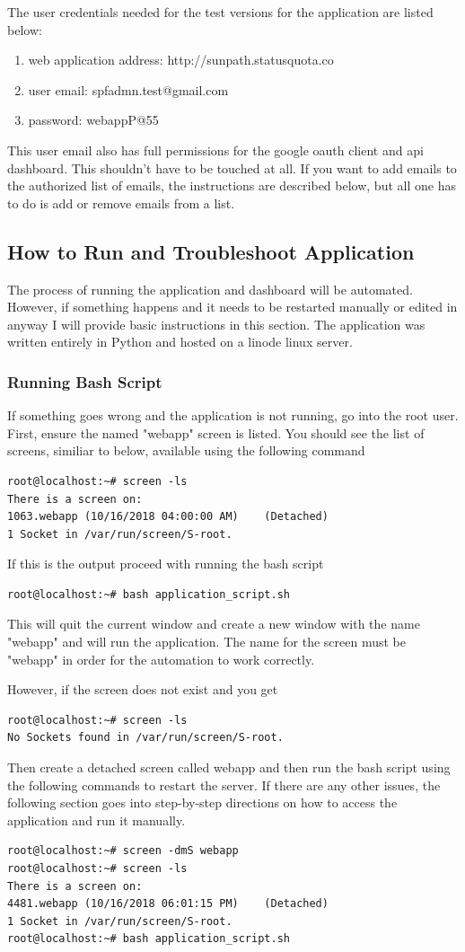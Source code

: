\documentclass[titlepage]{article}
\begin{document}
The user credentials needed for the test versions for the application are listed below: 
\begin{enumerate}
	\item web application address: http://sunpath.statusquota.co
	\item user email: spfadmn.test@gmail.com
	\item password: webappP@55
\end{enumerate}
This user email also has full permissions for the google oauth client and api dashboard. This shouldn't have to be touched at all. If you want to add emails to the authorized list of emails, the instructions are described below, but all one has to do is add or remove emails from a list. 
\newpage

\subsection{How to Run and Troubleshoot Application}
The process of running the application and dashboard will be automated. However, if something happens and it needs to be restarted manually or edited in anyway I will provide basic instructions in this section. The application was written entirely in Python and hosted on a linode linux server.

\subsubsection{Running Bash Script}
If something goes wrong and the application is not running, go into the root user. First, ensure the named "webapp" screen is listed. You should see the list of screens, similiar to below, available using the following command
\begin{verbatim}
root@localhost:~# screen -ls
There is a screen on:
1063.webapp	(10/16/2018 04:00:00 AM)	(Detached)
1 Socket in /var/run/screen/S-root.
\end{verbatim}
If this is the output proceed with running the bash script
\begin{verbatim}
root@localhost:~# bash application_script.sh
\end{verbatim}
This will quit the current window and create a new window with the name "webapp" and will run the application. The name for the screen must be "webapp" in order for the automation to work correctly.

However, if the screen does not exist and you get 
\begin{verbatim}
root@localhost:~# screen -ls
No Sockets found in /var/run/screen/S-root.
\end{verbatim}
Then create a detached screen called webapp and then run the bash script using the following commands to restart the server. If there are any other issues, the following section goes into step-by-step directions on how to access the application and run it manually. 
\begin{verbatim}
root@localhost:~# screen -dmS webapp 
root@localhost:~# screen -ls
There is a screen on:
4481.webapp	(10/16/2018 06:01:15 PM)	(Detached)
1 Socket in /var/run/screen/S-root.
root@localhost:~# bash application_script.sh 
\end{verbatim}
\end{document}
